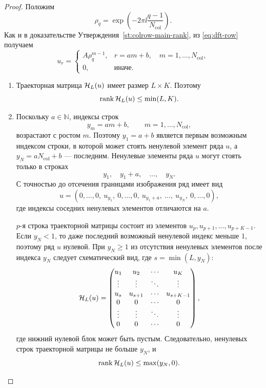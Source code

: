 \begin{proof}
Положим
\begin{equation*}
    \rho_q
    =
    \exp\left(
        -2\pi\ii\frac{q-1}{N_{\mathrm{col}}}
    \right).
\end{equation*}
Как и в доказательстве Утверждения~\ref{st:colrow-main-rank}, из
\eqref{eq:dft-row} получаем
\begin{equation}
    u_r
    =
    \begin{cases}
        A\rho_q^{m-1}, & r=am+b,\quad m=1,\dots,N_{\mathrm{col}},\\
        0, & \text{иначе}.
    \end{cases}
    \label{eq:u-structure-safe}
\end{equation}
\begin{enumerate}
    \item Траекторная матрица $\mathcal H_L(u)$ имеет размер $L\times K$.
    Поэтому
    \begin{equation}
        \operatorname{rank}\mathcal H_L(u)\le \min(L,K).
        \label{eq:rank-by-size}
    \end{equation}

    \item Поскольку $a\in\mathbb N$, индексы строк
    \[
        y_m=am+b,\qquad m=1,\dots,N_{\mathrm{col}},
    \]
    возрастают с ростом $m$. Поэтому $y_1=a+b$ является первым возможным
    индексом строки, в которой может стоять ненулевой элемент ряда $u$, а
    $y_N=aN_{\mathrm{col}}+b$ --- последним. Ненулевые элементы ряда $u$
    могут стоять только в строках
    \begin{equation*}
        y_1,\quad y_1+a,\quad \dots,\quad y_N.
    \end{equation*}
    С точностью до отсечения границами изображения ряд имеет вид
    \[
        u=(0,\dots,0,\ u_{y_1},\ 0,\dots,0,\ u_{y_1+a},\
        \dots,\ u_{y_N},\ 0,\dots,0),
    \]
    где индексы соседних ненулевых элементов отличаются на $a$.

    $p$-я строка траекторной матрицы состоит из элементов
    $u_p,u_{p+1},\dots,u_{p+K-1}$.
    Если $y_N<1$, то даже последний возможный ненулевой индекс меньше $1$,
    поэтому ряд $u$ нулевой. При $y_N\ge1$ из отсутствия ненулевых элементов
    после индекса $y_N$ следует схематический вид, где
    $s=\min(L,y_N)$:
    \[
        \mathcal H_L(u)=
        \begin{pmatrix}
            u_1 & u_2 & \cdots & u_K\\
            \vdots & \vdots & \ddots & \vdots\\
            u_s & u_{s+1} & \cdots & u_{s+K-1}\\
            0 & 0 & \cdots & 0\\
            \vdots & \vdots & \ddots & \vdots\\
            0 & 0 & \cdots & 0
        \end{pmatrix},
    \]
    где нижний нулевой блок может быть пустым. Следовательно, ненулевых строк
    траекторной матрицы не больше $y_N$, и
    \begin{equation}
        \operatorname{rank}\mathcal H_L(u)
        \le
        \max(y_N,0).
        \label{eq:rank-by-yN}
    \end{equation}


\end{enumerate}
\end{proof}
